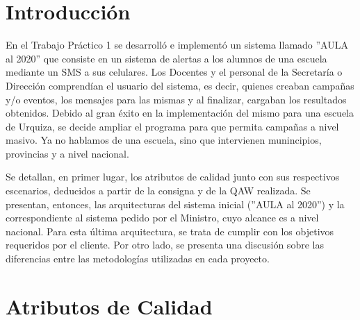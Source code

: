 \documentclass[a4paper, 11pt]{article}
\begin{document}
\pagestyle{myheadings}
\maketitle

\thispagestyle{empty}
\tableofcontents

\newpage

\section{Introducci\'on}
En el Trabajo Práctico 1 se desarrolló e implementó un sistema llamado ''AULA al 2020'' que consiste en un sistema de alertas a los alumnos de una escuela mediante un SMS a sus celulares. Los Docentes y el personal de la Secretaría o Dirección comprendían el usuario del sistema, es decir, quienes creaban campañas y/o eventos, los mensajes para las mismas y al finalizar, cargaban los resultados obtenidos. Debido al gran éxito en la implementación del mismo para una escuela de Urquiza, se decide ampliar el programa para que permita campañas a nivel masivo. Ya no hablamos de una escuela, sino que intervienen munincipios, provincias y a nivel nacional. 

Se detallan, en primer lugar, los atributos de calidad junto con sus respectivos escenarios, deducidos a partir de la consigna y de la QAW realizada. 
Se presentan, entonces, las arquitecturas del sistema inicial (''AULA al 2020'') y la correspondiente al sistema pedido por el Ministro, cuyo alcance es a nivel nacional. Para esta última arquitectura, se trata de cumplir con los objetivos requeridos por el cliente. Por otro lado, se presenta una discusión sobre las diferencias entre las metodologías utilizadas en cada proyecto.


\newpage
\section{Atributos de Calidad}
\end{document}
